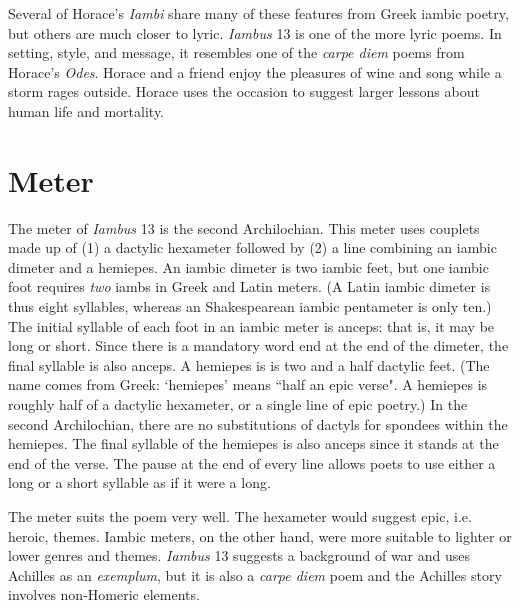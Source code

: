 Several of Horace's \textit{Iambi} share many of these features from Greek iambic poetry, but others are much closer to lyric.  \textit{Iambus} 13 is one of the more lyric poems.  In setting, style, and message, it resembles one of the \textit{carpe diem} poems from Horace's \textit{Odes}.  Horace and a friend enjoy the pleasures of wine and song while a storm rages outside.  Horace uses the occasion to suggest larger lessons about human life and mortality.


\section*{Meter}

The meter of \textit{Iambus} 13 is the second Archilochian. This meter uses couplets made up of (1) a dactylic hexameter followed by (2) a line combining an iambic dimeter and a hemiepes.  An iambic dimeter is two iambic feet, but one iambic foot requires \textit{two} iambs in Greek and Latin meters.  (A Latin iambic dimeter is thus eight syllables, whereas an Shakespearean iambic pentameter is only ten.)  The initial syllable of each foot in an iambic meter is anceps: that is, it may be long or short.  Since there is a mandatory word end at the end of the dimeter, the final syllable is also anceps.  A hemiepes is is two and a half dactylic feet.  (The name comes from Greek: `hemiepes' means ``half an epic verse".  A hemiepes is roughly half of a dactylic hexameter, or a single line of epic poetry.)  In the second Archilochian, there are no substitutions of dactyls for spondees within the hemiepes.  The final syllable of the hemiepes is also anceps since it stands at the end of the verse.  The pause at the end of every line allows poets to use either a long or a short syllable as if it were a long.\newline

\indent\metra{\m\mbb\m\mbb\m\c\mbb\m\mbb\m\bb\m\mb}

\indent\indent\metra{\mb\m\b\m\mb\m\b\mb\cc\m\bb\m\bb\mb}\newline

The meter suits the poem very well.  The hexameter would suggest epic, i.e.  heroic, themes.  Iambic meters, on the other hand, were more suitable to lighter or lower genres and themes.  \textit{Iambus} 13 suggests a background of war and uses Achilles as an \textit{exemplum}, but it is also a \textit{carpe diem} poem and the Achilles story involves non-Homeric elements.

